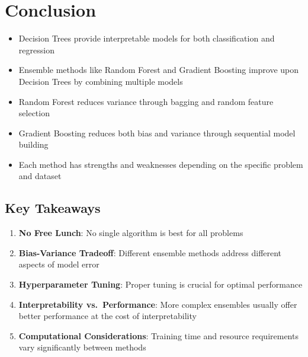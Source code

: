 \documentclass[
  letterpaper,
  DIV=11,
  numbers=noendperiod]{scrreprt}
\providecommand{\tightlist}{%
  \setlength{\itemsep}{0pt}\setlength{\parskip}{0pt}}\usepackage{longtable,booktabs,array}
\begin{document}
\section{Conclusion}\label{conclusion-1}

\begin{itemize}
\tightlist
\item
  Decision Trees provide interpretable models for both classification
  and regression
\item
  Ensemble methods like Random Forest and Gradient Boosting improve upon
  Decision Trees by combining multiple models
\item
  Random Forest reduces variance through bagging and random feature
  selection
\item
  Gradient Boosting reduces both bias and variance through sequential
  model building
\item
  Each method has strengths and weaknesses depending on the specific
  problem and dataset
\end{itemize}

\subsection{Key Takeaways}\label{key-takeaways}

\begin{enumerate}
\def\labelenumi{\arabic{enumi}.}
\tightlist
\item
  \textbf{No Free Lunch}: No single algorithm is best for all problems
\item
  \textbf{Bias-Variance Tradeoff}: Different ensemble methods address
  different aspects of model error
\item
  \textbf{Hyperparameter Tuning}: Proper tuning is crucial for optimal
  performance
\item
  \textbf{Interpretability vs.~Performance}: More complex ensembles
  usually offer better performance at the cost of interpretability
\item
  \textbf{Computational Considerations}: Training time and resource
  requirements vary significantly between methods
\end{enumerate}
\end{document}
